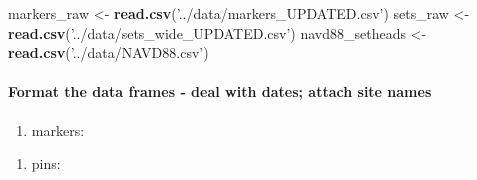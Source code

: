 \documentclass[]{article}
\newenvironment{Shaded}{\begin{snugshade}}{\end{snugshade}}
\newcommand{\KeywordTok}[1]{\textcolor[rgb]{0.13,0.29,0.53}{\textbf{#1}}}
\newcommand{\DataTypeTok}[1]{\textcolor[rgb]{0.13,0.29,0.53}{#1}}
\newcommand{\StringTok}[1]{\textcolor[rgb]{0.31,0.60,0.02}{#1}}
\newcommand{\OperatorTok}[1]{\textcolor[rgb]{0.81,0.36,0.00}{\textbf{#1}}}
\newcommand{\NormalTok}[1]{#1}
\providecommand{\tightlist}{%
  \setlength{\itemsep}{0pt}\setlength{\parskip}{0pt}}
\let\oldparagraph\paragraph
\renewcommand{\paragraph}[1]{\oldparagraph{#1}\mbox{}}
\begin{document}
\begin{Shaded}
\begin{Highlighting}[]
\NormalTok{markers_raw <-}\StringTok{ }\KeywordTok{read.csv}\NormalTok{(}\StringTok{'../data/markers_UPDATED.csv'}\NormalTok{)}
\NormalTok{sets_raw <-}\StringTok{ }\KeywordTok{read.csv}\NormalTok{(}\StringTok{'../data/sets_wide_UPDATED.csv'}\NormalTok{)}
\NormalTok{navd88_setheads <-}\StringTok{ }\KeywordTok{read.csv}\NormalTok{(}\StringTok{'../data/NAVD88.csv'}\NormalTok{)}
\end{Highlighting}
\end{Shaded}

\paragraph{Format the data frames - deal with dates; attach site
names}\label{format-the-data-frames---deal-with-dates-attach-site-names}

\begin{enumerate}
\def\labelenumi{\alph{enumi}.}
\tightlist
\item
  markers:
\end{enumerate}

\begin{Shaded}
\end{Shaded}

\begin{enumerate}
\def\labelenumi{\alph{enumi}.}
\setcounter{enumi}{1}
\tightlist
\item
  pins:
\end{enumerate}
\end{document}
